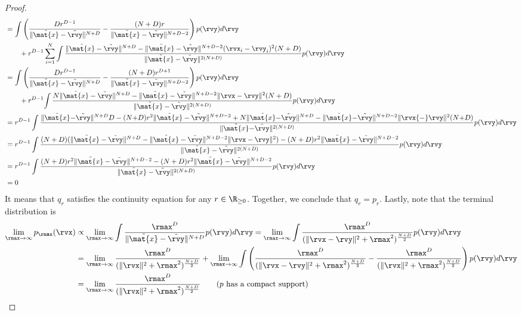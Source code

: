 \begin{proof}
\begin{align*}
    &=\int \left(\frac{Dr^{D-1}}{{\|\tilde{\mat{x}}-\tilde{\rvy}\|^{N+D}}} - \frac{(N+D)r}{{\|\tilde{\mat{x}}-\tilde{\rvy}\|^{N+D-2}}}\right)p(\rvy)d\rvy\\
    &\qquad +r^{D-1}\sum_{i=1}^N{\int \frac{\|\tilde{\mat{x}}-\tilde{\rvy}\|^{N+D} - \|\tilde{\mat{x}}-\tilde{\rvy}\|^{N+D-2}(\rvx_i -\rvy_i)^2(N+D)}{\|\tilde{\mat{x}}-\tilde{\rvy}\|^{2(N+D)}}{p}({\rvy}) d {\rvy}}\\
    &=\int \left(\frac{Dr^{D-1}}{{\|\tilde{\mat{x}}-\tilde{\rvy}\|^{N+D}}} - \frac{(N+D)r^{D+1}}{{\|\tilde{\mat{x}}-\tilde{\rvy}\|^{N+D-2}}}\right)p(\rvy)d\rvy\\
    &\qquad +r^{D-1}{\int \frac{N\|\tilde{\mat{x}}-\tilde{\rvy}\|^{N+D} - \|\tilde{\mat{x}}-\tilde{\rvy}\|^{N+D-2}\|\rvx-\rvy\|^2(N+D)}{\|\tilde{\mat{x}}-\tilde{\rvy}\|^{2(N+D)}}{p}({\rvy}) d {\rvy}}\\
    &=r^{D-1}\int \frac{\|\tilde{\mat{x}}{-}\tilde{\rvy}\|^{N{+}D}D-(N{+}D)r^{2}\|\tilde{\mat{x}}-\tilde{\rvy}\|^{N{+}D{-}2}+N\|\tilde{\mat{x}}{-}\tilde{\rvy}\|^{N{+}D}-\|\tilde{\mat{x}}{-}\tilde{\rvy}\|^{N{+}D{-}2}\|\rvx{-}\rvy\|^2(N{+}D)}{{\|\tilde{\mat{x}}{-}\tilde{\rvy}\|^{2(N{+}D)}}}p(\rvy)d\rvy\\
    &=r^{D-1}\int \frac{(N+D)(\|\tilde{\mat{x}}-\tilde{\rvy}\|^{N+D}-\|\tilde{\mat{x}}-\tilde{\rvy}\|^{N+D-2}\|\rvx-\rvy\|^2)-(N+D)r^{2}\|\tilde{\mat{x}}-\tilde{\rvy}\|^{N+D-2}}{{\|\tilde{\mat{x}}-\tilde{\rvy}\|^{2(N+D)}}}p(\rvy)d\rvy\\
    &=r^{D-1}\int \frac{(N+D)r^{2}\|\tilde{\mat{x}}-\tilde{\rvy}\|^{N+D-2}-(N+D)r^{2}\|\tilde{\mat{x}}-\tilde{\rvy}\|^{N+D-2}}{{\|\tilde{\mat{x}}-\tilde{\rvy}\|^{2(N+D)}}}p(\rvy)d\rvy\\
    &=0
\end{align*}
It means that $q_r$ satisfies the continuity equation for any $r\in \R_{\ge 0}$. Together, we conclude that $q_r=p_r$. Lastly, note that the terminal distribution is 
\begin{align*}
    \lim_{\rmax\to \infty}p_{\rmax}(\rvx) &\propto \lim_{\rmax\to \infty} \int \frac{\rmax^D}{\|\tilde{\mat{x}}-\tilde{\rvy}\|^{N+D}}p(\rvy)d\rvy=\lim_{\rmax\to \infty}\int \frac{\rmax^D}{(\|\rvx-\rvy\|^2+\rmax^2)^\frac{N+D}{2}}p(\rvy)d\rvy\\
    &= \lim_{\rmax\to \infty}\frac{\rmax^D}{(\|\rvx\|^2+\rmax^2)^\frac{N+D}{2}}  + \lim_{\rmax\to \infty}\int \left(\frac{\rmax^D}{(\|\rvx-\rvy\|^2+\rmax^2)^\frac{N+D}{2}}-\frac{\rmax^D}{(\|\rvx\|^2+\rmax^2)^\frac{N+D}{2}}\right)p(\rvy)d\rvy\\
    &= \lim_{\rmax\to \infty}\frac{\rmax^D}{(\|\rvx\|^2+\rmax^2)^\frac{N+D}{2}} \qquad \text{($p$ has a compact support)}
\end{align*}
\end{proof}


